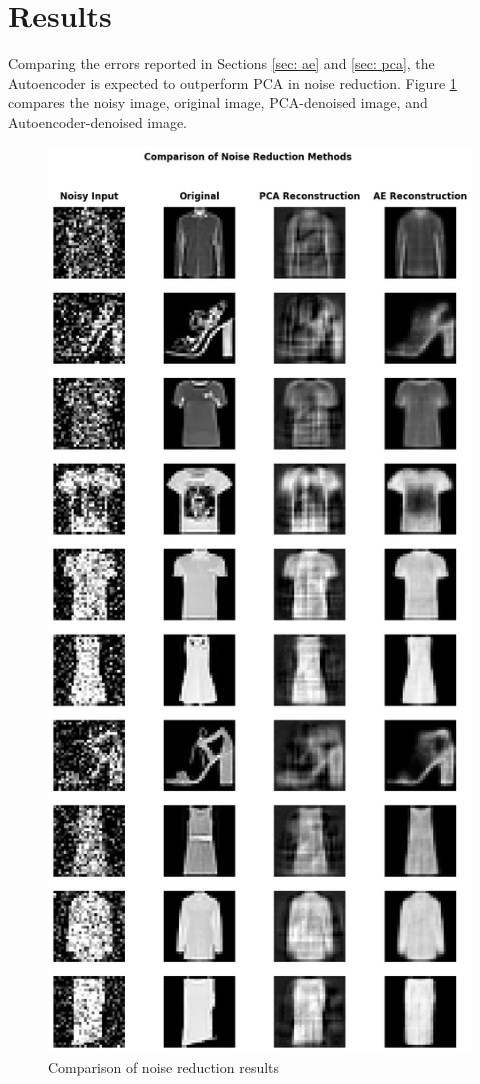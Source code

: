 \documentclass[12pt]{article}
\begin{document}
	\section{Results}\label{sec: results}
	Comparing the errors reported in Sections \ref{sec: ae} and \ref{sec: pca}, the Autoencoder is expected to outperform PCA in noise reduction. Figure \ref{fig: method comparison} compares the noisy image, original image, PCA-denoised image, and Autoencoder-denoised image.
	\begin{figure}[H]
		\centering
		\includegraphics[scale=0.45]{figs/resutl comparison}
		\caption{Comparison of noise reduction results}
		\label{fig: method comparison}
	\end{figure}
\end{document}
